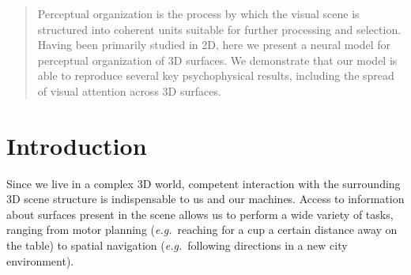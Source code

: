 \documentclass[conference]{IEEEtran}
\newcommand{\eg}[0]{{\em e.g.}\ }
\begin{document}
\begin{abstract}
Perceptual organization is the process by which the visual scene is
structured into coherent units suitable for further processing and
selection. Having been primarily studied in 2D, here we present a
neural model for perceptual organization of 3D surfaces. We
demonstrate that our model is able to reproduce several key
psychophysical results, including the spread of visual attention across 3D
surfaces. 
\end{abstract}





%
\IEEEpeerreviewmaketitle



\section{Introduction}
Since we live in a complex 3D world, competent interaction with the
surrounding 3D scene structure is indispensable to us and our
machines. Access to information about
surfaces present in the scene allows us to perform a wide variety of
tasks, ranging from motor planning (\eg reaching for a cup a certain
distance away on the table) to spatial navigation (\eg following
directions in a new city environment).

\end{document}
